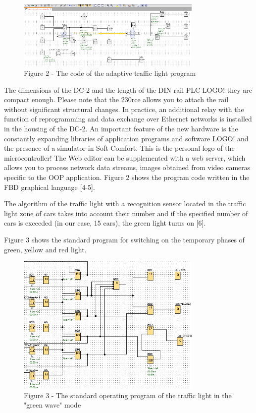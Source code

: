 \begin{figure}[H]
	\centering
	\includegraphics[width=0.8\textwidth]{media/ict/image6}
	\caption*{Figure 2 - The code of the adaptive traffic light program}
\end{figure}

\begin{multicols}{2}
The dimensions of the DC-2 and the length of the DIN rail PLC LOGO! they
are compact enough. Please note that the 230rce allows you to attach the
rail without significant structural changes. In practice, an additional
relay with the function of reprogramming and data exchange over Ethernet
networks is installed in the housing of the DC-2. An important feature
of the new hardware is the constantly expanding libraries of application
programs and software LOGO! and the presence of a simulator in Soft
Comfort. This is the personal logo of the microcontroller! The Web
editor can be supplemented with a web server, which allows you to
process network data streams, images obtained from video cameras
specific to the OOP application. Figure 2 shows the program code written
in the FBD graphical language {[}4-5{]}.

The algorithm of the traffic light with a recognition sensor located in
the traffic light zone of cars takes into account their number and if
the specified number of cars is exceeded (in our case, 15 cars), the
green light turns on {[}6{]}.

Figure 3 shows the standard program for switching on the temporary
phases of green, yellow and red light.
\end{multicols}

\begin{figure}[H]
	\centering
	\includegraphics[width=0.8\textwidth]{media/ict/image7}
	\caption*{Figure 3 - The standard operating program of the traffic light
in the "green wave" mode}
\end{figure}

